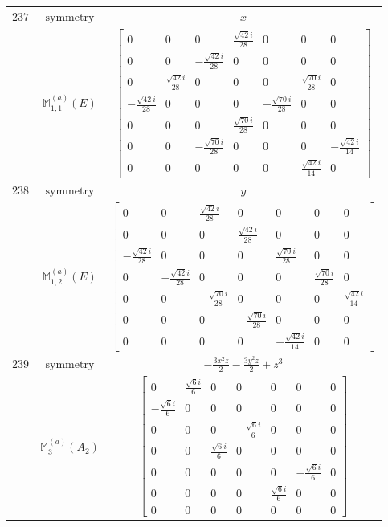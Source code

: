 \documentclass[fleqn,8pt,landscape]{jsarticle}
\begin{document}
\begin{longtable}{ccc}
$ 237 $ & $ \text{symmetry} $ & $ x $ \\
$  $ & $ \mathbb{M}_{1,1}^{(a)}(E) $ & $ \begin{bmatrix} 0 & 0 & 0 & \frac{\sqrt{42} i}{28} & 0 & 0 & 0 \\ 0 & 0 & - \frac{\sqrt{42} i}{28} & 0 & 0 & 0 & 0 \\ 0 & \frac{\sqrt{42} i}{28} & 0 & 0 & 0 & \frac{\sqrt{70} i}{28} & 0 \\ - \frac{\sqrt{42} i}{28} & 0 & 0 & 0 & - \frac{\sqrt{70} i}{28} & 0 & 0 \\ 0 & 0 & 0 & \frac{\sqrt{70} i}{28} & 0 & 0 & 0 \\ 0 & 0 & - \frac{\sqrt{70} i}{28} & 0 & 0 & 0 & - \frac{\sqrt{42} i}{14} \\ 0 & 0 & 0 & 0 & 0 & \frac{\sqrt{42} i}{14} & 0 \end{bmatrix} $ \\ \hline
$ 238 $ & $ \text{symmetry} $ & $ y $ \\
$  $ & $ \mathbb{M}_{1,2}^{(a)}(E) $ & $ \begin{bmatrix} 0 & 0 & \frac{\sqrt{42} i}{28} & 0 & 0 & 0 & 0 \\ 0 & 0 & 0 & \frac{\sqrt{42} i}{28} & 0 & 0 & 0 \\ - \frac{\sqrt{42} i}{28} & 0 & 0 & 0 & \frac{\sqrt{70} i}{28} & 0 & 0 \\ 0 & - \frac{\sqrt{42} i}{28} & 0 & 0 & 0 & \frac{\sqrt{70} i}{28} & 0 \\ 0 & 0 & - \frac{\sqrt{70} i}{28} & 0 & 0 & 0 & \frac{\sqrt{42} i}{14} \\ 0 & 0 & 0 & - \frac{\sqrt{70} i}{28} & 0 & 0 & 0 \\ 0 & 0 & 0 & 0 & - \frac{\sqrt{42} i}{14} & 0 & 0 \end{bmatrix} $ \\ \hline
$ 239 $ & $ \text{symmetry} $ & $ - \frac{3 x^{2} z}{2} - \frac{3 y^{2} z}{2} + z^{3} $ \\
$  $ & $ \mathbb{M}_{3}^{(a)}(A_{2}) $ & $ \begin{bmatrix} 0 & \frac{\sqrt{6} i}{6} & 0 & 0 & 0 & 0 & 0 \\ - \frac{\sqrt{6} i}{6} & 0 & 0 & 0 & 0 & 0 & 0 \\ 0 & 0 & 0 & - \frac{\sqrt{6} i}{6} & 0 & 0 & 0 \\ 0 & 0 & \frac{\sqrt{6} i}{6} & 0 & 0 & 0 & 0 \\ 0 & 0 & 0 & 0 & 0 & - \frac{\sqrt{6} i}{6} & 0 \\ 0 & 0 & 0 & 0 & \frac{\sqrt{6} i}{6} & 0 & 0 \\ 0 & 0 & 0 & 0 & 0 & 0 & 0 \end{bmatrix} $ \\ \hline

\end{longtable}
\end{document}

